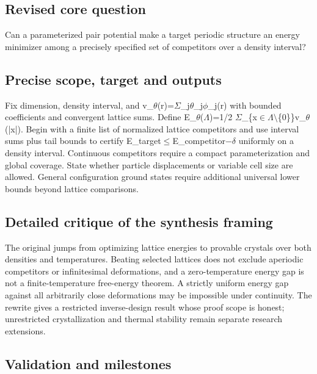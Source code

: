 \documentclass[
  11pt,
]{article}
\begin{document}
\subsection{Revised core question}

Can a parameterized pair potential make a target periodic structure an
energy minimizer among a precisely specified set of competitors over a
density interval?

\subsection{Precise scope, target and outputs}

Fix dimension, density interval, and
v\_\ensuremath{\theta}(r)=\ensuremath{\Sigma}\_j\ensuremath{\theta}\_j\ensuremath{\phi}\_j(r)
with bounded coefficients and convergent lattice sums. Define
E\_\ensuremath{\theta}(\ensuremath{\Lambda})=1/2
\ensuremath{\Sigma}\_\{x\ensuremath{\in}\ensuremath{\Lambda}\ensuremath{\setminus}\{0\}\}v\_\ensuremath{\theta}(|x|).
Begin with a finite list of normalized lattice competitors and use
interval sums plus tail bounds to certify
E\_target\ensuremath{\le}E\_competitor\ensuremath{-}\ensuremath{\delta}
uniformly on a density interval. Continuous competitors require a
compact parameterization and global coverage. State whether particle
displacements or variable cell size are allowed. General configuration
ground states require additional universal lower bounds beyond lattice
comparisons.

\subsection{Detailed critique of the synthesis framing}

The original jumps from optimizing lattice energies to provable crystals
over both densities and temperatures. Beating selected lattices does not
exclude aperiodic competitors or infinitesimal deformations, and a
zero-temperature energy gap is not a finite-temperature free-energy
theorem. A strictly uniform energy gap against all arbitrarily close
deformations may be impossible under continuity. The rewrite gives a
restricted inverse-design result whose proof scope is honest;
unrestricted crystallization and thermal stability remain separate
research extensions.

\subsection{Validation and milestones}
\end{document}
